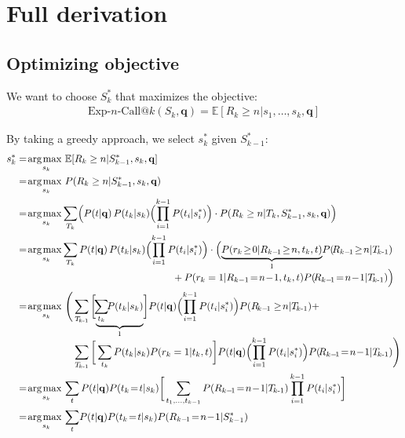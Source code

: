 \documentclass[a4paper]{article}
\makeatletter
\renewcommand{\vec}[1]{\mathbf{#1}}
\newcommand{\ExpNCall}[1]{\text{Exp-}#1\text{-Call@}k}
\newcommand{\TlessK}{T_{\!\!\:k\text{-}1}}
\def\argmax{\operatornamewithlimits{\!arg \;\! max\,}}
\makeatother
\begin{document}
\appendix
\section{Full derivation}
\subsection{Optimizing objective}
We want to choose $S_k^*$ that maximizes the objective:
\begin{align*}
  \ExpNCall{n}(S_k,\vec{q})
  = \mathbb{E}[R_k\geq n|s_1,\dots,s_k,\vec{q}]
\end{align*}

\noindent
By taking a greedy approach, we select $s_k^*$ given $S_{k-1}^*$:
\begin{align}
  s_k^* & = \argmax_{s_k} \mathbb{E}[R_k\geq n|S_{k-1}^*,s_k,\vec{q}] \nonumber\\
% 
  & = \argmax_{s_k} P(R_k\geq n|S_{k-1}^*,s_k,\vec{q}) \label{note1}\\
%
  & = \argmax_{s_k} \!\sum_{T_k} \Bigl( P(t|\vec{q}) \,P(t_k|s_k) \Bigl( \prod_{i=1}^{k-1} P(t_i|s_i^*) \Bigr) \cdot P(R_k\geq n|T_k,S_{k-1}^*,s_k,\vec{q}) \Bigr) \label{note2}\\
%
  & = \argmax_{s_k} \!\sum_{T_k} P(t|\vec{q}) \,P(t_k|s_k) \Bigl( \prod_{i=1}^{k-1} P(t_i|s_i^*) \Bigr) \cdot \Bigl( \mbox{$\underbrace{P(r_k\!\geq\!0|R_{k-\!1}\!\geq\!n,t_k,t)}_{1}$} P(\!R_{k-\!1}\!\geq\!n|\TlessK) \nonumber \\[-1.5mm]
  & \hspace{55mm} + P(r_k=1|R_{k-1}\!=\!n\!-\!1,t_k,t) P(\!R_{k-\!1}\!=\!n\!-\!1|\TlessK) \Big) \label{note3}\\
%
  & = \argmax_{s_k} \Bigg( \sum_{\TlessK} \bigg[ \mbox{$\underbrace{ \!\sum_{t_k} \!\!P(t_k|s_k) }_{1}$} \bigg] P(t|\vec{q}) \Bigl( \prod_{i=1}^{k-1} P(t_i|s_i^*) \Bigr) P(R_{\!k-\!1}\geq\!n|\TlessK) + \nonumber \\[-1.5mm]
  & \hspace{20mm} \sum_{\TlessK} \bigg[ \sum_{t_k} P(t_k|s_k) P(r_k=1|t_k,t) \bigg] P(t|\vec{q}) \Bigl( \prod_{i=1}^{k-1} P(t_i|s_i^*) \Bigr) P(\!R_{k-\!1}\!=\!n\!-\!1|\TlessK) \Bigg) \nonumber\\
%
  & = \argmax_{s_k} \sum_{t} P(t|\vec{q}) P(t_k\!=\!t|s_k) \bigg[ \sum_{t_1, \dots, t_{k-1}}  P(R_{k-\!1}\!=\!n\!-\!1|\TlessK) \prod_{i=1}^{k-1} P(t_i|s_i^*) \bigg] \label{note4}\\
%
  & = \argmax_{s_k} \sum_{t} \!P(t|\vec{q}) P(t_k\!=\!t|s_k) P(R_{k-\!1}\!=\!n\!-\!1|S_{k-1}^*) \label{eq.ncall}
\end{align}
\end{document}
